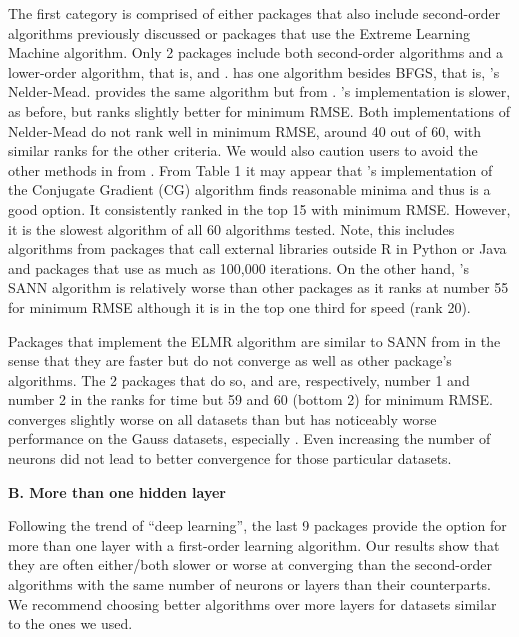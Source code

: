 The first category is comprised of either packages that also include
second-order algorithms previously discussed or packages that use the
Extreme Learning Machine algorithm. Only 2 packages include both
second-order algorithms and a lower-order algorithm, that is,
 and .  has one
algorithm besides BFGS, that is, 's Nelder-Mead.
 provides the same algorithm but from .
's implementation is slower, as before, but ranks
slightly better for minimum RMSE. Both implementations of Nelder-Mead do
not rank well in minimum RMSE, around 40 out of 60, with similar ranks
for the other criteria. We would also caution users to avoid the other
methods in  from . From Table 1 it may
appear that 's implementation of the Conjugate
Gradient (CG) algorithm finds reasonable minima and thus is a good
option. It consistently ranked in the top 15 with minimum RMSE. However,
it is the slowest algorithm of all 60 algorithms tested. Note, this
includes algorithms from packages that call external libraries outside
\textsf{R} in \textsf{Python} or \textsf{Java} and packages that use as
much as 100,000 iterations. On the other hand, 's SANN
algorithm is relatively worse than other packages as it ranks at number
55 for minimum RMSE although it is in the top one third for speed (rank
20).

Packages that implement the ELMR algorithm are similar to SANN from
 in the sense that they are faster but do not converge
as well as other package's algorithms. The 2 packages that do so,
 \citep{R-elmNNRcpp} and 
\citep{R-ELMR} are, respectively, number 1 and number 2 in the ranks for
time but 59 and 60 (bottom 2) for minimum RMSE.  converges
slightly worse on all datasets than  but has
noticeably worse performance on the Gauss datasets, especially
. Even increasing the number of neurons did not lead to
better convergence for those particular datasets.

\textbf{B. More than one hidden layer}

Following the trend of ``deep learning'', the last 9 packages provide
the option for more than one layer with a first-order learning
algorithm. Our results show that they are often either/both slower or
worse at converging than the second-order algorithms with the same
number of neurons or layers than their counterparts. We recommend
choosing better algorithms over more layers for datasets similar to the
ones we used.

